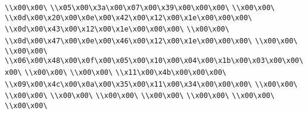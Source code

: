 \verb|\\x00\x00\|\newline
\verb|\\x05\x00\x3a\x00\x07\x00\x39\x00\x00\x00\|\newline
\verb|\\x00\x00\|\newline
\verb|\\x0d\x00\x20\x00\x0e\x00\x42\x00\x12\x00\x1e\x00\x00\x00\|\newline
\verb|\\x0d\x00\x43\x00\x12\x00\x1e\x00\x00\x00\|\newline
\verb|\\x00\x00\|\newline
\verb|\\x0d\x00\x47\x00\x0e\x00\x46\x00\x12\x00\x1e\x00\x00\x00\|\newline
\verb|\\x00\x00\|\newline
\verb|\\x00\x00\|\newline
\verb|\\x06\x00\x48\x00\x0f\x00\x05\x00\x10\x00\x04\x00\x1b\x00\x03\x00\x00\x00\|\newline
\verb|\\x00\x00\|\newline
\verb|\\x00\x00\|\newline
\verb|\\x11\x00\x4b\x00\x00\x00\|\newline
\verb|\\x09\x00\x4c\x00\x0a\x00\x35\x00\x11\x00\x34\x00\x00\x00\|\newline
\verb|\\x00\x00\|\newline
\verb|\\x00\x00\|\newline
\verb|\\x00\x00\|\newline
\verb|\\x00\x00\|\newline
\verb|\\x00\x00\|\newline
\verb|\\x00\x00\|\newline
\verb|\\x00\x00\|\newline
\verb|\\x00\x00\|\newline
